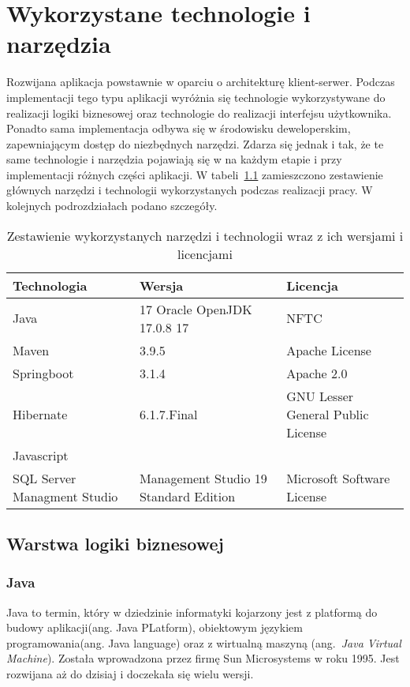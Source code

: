 \chapter{Wykorzystane technologie i narzędzia}
Rozwijana aplikacja powstawnie w oparciu o architekturę klient-serwer. Podczas implementacji tego typu aplikacji wyróżnia się technologie wykorzystywane do realizacji logiki biznesowej oraz technologie do realizacji interfejsu użytkownika. Ponadto sama implementacja odbywa się w środowisku deweloperskim, zapewniającym dostęp do niezbędnych narzędzi. Zdarza się jednak i tak, że te same technologie i narzędzia pojawiają się w na każdym etapie i przy implementacji różnych części aplikacji.
W tabeli~\ref{tab:zestawienie_narzędzi} zamieszczono zestawienie głównych narzędzi i technologii wykorzystanych podczas realizacji pracy.
W kolejnych podrozdziałach podano szczegóły.


\begin{table}[htb] \small
	\centering
\caption{Zestawienie wykorzystanych narzędzi i technologii wraz z ich wersjami i licencjami}
\label{tab:zestawienie_narzędzi}
\begin{tabularx}{\linewidth}{|X|X|X|}
    \hline
    Technologia & Wersja & Licencja \\
    \hline \hline
    Java & 17 Oracle OpenJDK 17.0.8 17 &  NFTC\\
    \hline
    Maven & 3.9.5 & Apache License\\
    \hline
    Springboot & 3.1.4 & Apache 2.0\\
    \hline
    Hibernate & 6.1.7.Final & GNU Lesser General Public License \\
    \hline
		Javascript & & \\
    \hline
		SQL Server Managment Studio & Management Studio 19 Standard Edition & Microsoft Software License\\

    \hline
\end{tabularx}
\end{table}

\section{Warstwa logiki biznesowej}
\subsection{Java}
Java to termin, który w dziedzinie informatyki kojarzony jest z platformą do budowy aplikacji(ang. Java PLatform), obiektowym językiem programowania(ang. Java language) oraz z wirtualną maszyną (ang.~\emph{Java Virtual Machine}). Została wprowadzona przez firmę Sun Microsystems w roku 1995. Jest rozwijana aż do dzisiaj i doczekała się wielu wersji. 

